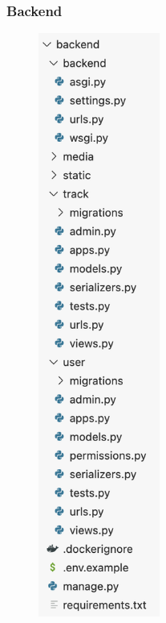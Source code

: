 \documentclass[a4paper]{article}
\begin{document}
\subsubsection{Backend}
\begin{figure}[h!]
\begin{center}
\includegraphics[width=4cm]{backend_folder.png}
\end{center}
\end{figure}
\newpage
\end{document}
